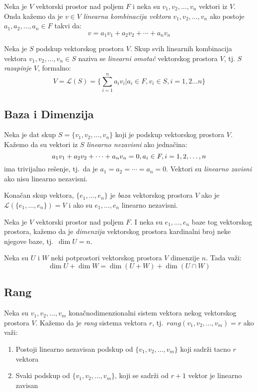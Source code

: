 \documentclass[12p,a4paper]{article}
\begin{document}
\begin{multicols}{2}
    Neka je $V$ vektorski prostor nad poljem $F$ i neka su 
    $v_1, v_2, \ldots ,v_n$ vektori iz $V$. Onda kažemo da je $v \in V$ 
    \textit{linearna kombinacija vektora} $v_1, v_2, \ldots ,v_n$ ako postoje 
    $a_1, a_2, \ldots , a_n \in F$ takvi da:
    \[v = a_1 v_1 + a_2 v_2 + \cdots + a_n v_n\]

    Neka je $S$ podskup vektorskog prostora $V$. Skup svih linearnih 
    kombinacija vektora $v_1, v_2, \ldots ,v_n \in S$ naziva se 
    \textit{linearni omotač} vektorskog prostora $V$, tj. 
    $S$ \textit{razapinje} $V$, formalno:
    \[V = \mathcal{L} (S) = \{ \sum_{i=1}^n a_i v_i | 
    a_i \in F, v_i \in S, i = 1, 2 \ldots n \}\]

\subsection{Baza i Dimenzija}

    Neka je dat skup $S = \{ v_1, v_2, \ldots, v_n \}$ koji je podskup 
    vektorskog prostora $V$. Kažemo da su vektori iz $S$ 
    \textit{linearno nezavisni} ako jednačina:
    \[a_1 v_1 + a_2 v_2 + \cdots + a_n v_n = 0, 
    \\ a_i \in F, i = 1, 2, \ldots, n\]
    ima trivijalno rešenje, tj.\ da je $a_1 = a_2 = \cdots = a_n = 0$. 
    Vektori su \textit{linearno zavisni} ako nisu linearno nezavisni.

    Konačan skup vektora, $\{e_1, \ldots, e_n\}$ je \textit{baza} vektorskog 
    prostora $V$ ako je $\mathcal{L} (\{e_1, \ldots, e_n\}) = V$ i ako su 
    $e_1, \dots, e_n$ linearno nezavisni.

    Neka je $V$ vektorski prostor nad poljem $F$. I neka su $e_1, \ldots, e_n$ 
    baze tog vektorskog prostora, kažemo da je \textit{dimenzija} vektorskog 
    prostora kardinalni broj neke njegove baze, tj.\ $\dim U = n$.

    Neka su $U$ i $W$ neki potprostori vektorskog prostora $V$ dimenzije $n$. 
    Tada važi:
    \[\dim U + \dim W = \dim(U + W) + \dim(U \cap W)\]

\subsection{Rang}

    Neka su $v_1, v_2, \ldots, v_m$ konačnodimenzionalni sistem vektora nekog 
    vektorskog prostora $V$. Kažemo da je \textit{rang} sistema vektora 
    $r$, tj.\ $ rang (v_1, v_2, \ldots, v_m) = r$ ako važi:
    \begin{enumerate}
        \itemsep0em
        \item Postoji linearno nezavisan podskup od 
            $\{v_1, v_2, \ldots, v_m \}$ koji sadrži tacno $r$ vektora
        \item Svaki podskup od $\{v_1, v_2, \ldots, v_m \}$, koji se sadrži 
            od $r + 1$ vektor je linearno zavisan
    \end{enumerate}


\end{multicols}
\end{document}
